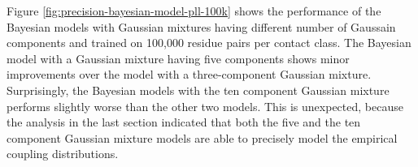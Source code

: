 \documentclass[11pt,a4paper,twoside]{book}
\theoremstyle{definition}
\theoremstyle{definition}
\theoremstyle{remark}
\begin{document}
Figure \ref{fig:precision-bayesian-model-pll-100k} shows the performance
of the Bayesian models with Gaussian mixtures having different number of
Gaussain components and trained on 100,000 residue pairs per contact
class. The Bayesian model with a Gaussian mixture having five components
shows minor improvements over the model with a three-component Gaussian
mixture. Surprisingly, the Bayesian models with the ten component
Gaussian mixture performs slightly worse than the other two models. This
is unexpected, because the analysis in the last section indicated that
both the five and the ten component Gaussian mixture models are able to
precisely model the empirical coupling distributions.
\end{document}
